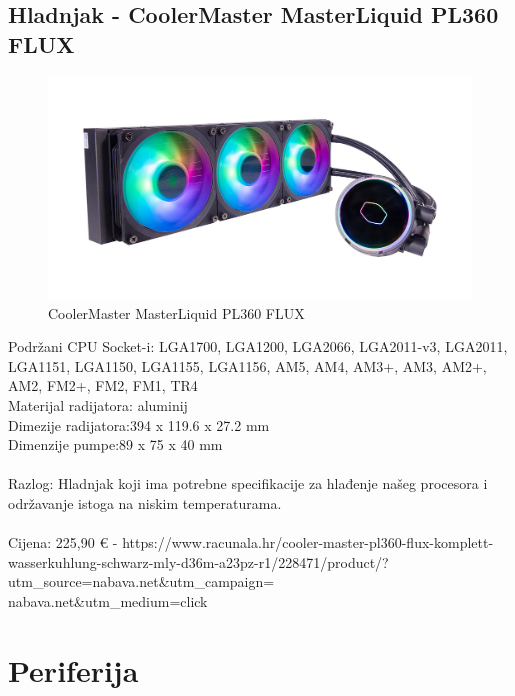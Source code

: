 \documentclass{report}
\begin{document}
\pagebreak

\section{Hladnjak - CoolerMaster MasterLiquid PL360 FLUX}
\begin{figure}[H]
    \centering
    \includegraphics[scale=0.22]{Slike/hladnjak.jpg}
    \caption{CoolerMaster MasterLiquid PL360 FLUX}
    \label{fig:hladnjak}
\end{figure}
Podržani CPU Socket-i: LGA1700, LGA1200, LGA2066, LGA2011-v3, LGA2011, LGA1151, LGA1150, LGA1155, LGA1156, AM5, AM4, AM3+, AM3, AM2+, AM2, FM2+, FM2, FM1, TR4\\Materijal radijatora: aluminij\\Dimezije radijatora:394 x 119.6 x 27.2 mm \\Dimenzije pumpe:89 x 75 x 40 mm\\\\Razlog: Hladnjak koji ima potrebne specifikacije za hlađenje našeg procesora i održavanje istoga na niskim temperaturama.\\\\Cijena: 225,90 € - https://www.racunala.hr/cooler-master-pl360-flux-komplett-wasserkuhlung-schwarz-mly-d36m-a23pz-r1/228471/product/?utm\_source=nabava.net\&utm\_campaign=\\nabava.net\&utm\_medium=click

\pagebreak

\chapter{Periferija}
\end{document}

